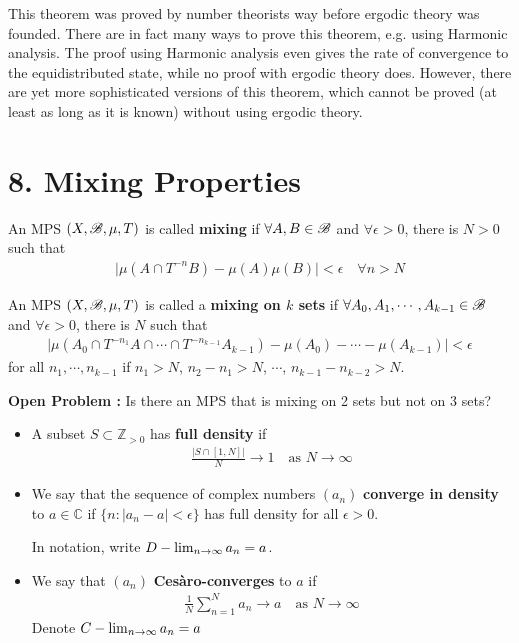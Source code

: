 \documentclass[12pt,a4paper]{report}
\begin{document}
This theorem was proved by number theorists way before ergodic theory was founded. There are in fact many ways to prove this theorem, e.g. using Harmonic analysis. The proof using Harmonic analysis even gives the rate of convergence to the equidistributed state, while no proof with ergodic theory does. However, there are yet more sophisticated versions of this theorem, which cannot be proved (at least as long as it is known) without using ergodic theory.
\s

\section*{8. Mixing Properties}

 An MPS $(X,\mathscr{B}, \mu,T)$ is called \textbf{mixing} if $\forall A,B\in \mathscr{B}$ and $\forall \epsilon>0$, there is $N>0$ such that
\begin{align*}
\Big| \mu(A\cap T^{-n}B) - \mu(A)\mu(B) \Big| < \epsilon \quad \forall n >N
\end{align*}
\s

 An MPS $(X,\mathscr{B}, \mu, T)$ is called a \textbf{mixing on $k$ sets} if $\forall A_0, A_1, \cdots,A_{k-1} \in \mathscr{B}$ and $\forall \epsilon >0$, there is $N$ such that
\begin{align*}
\Big| \mu(A_0 \cap T^{-n_1} A \cap \cdots \cap T^{-n_{k-1}}A_{k-1}) - \mu(A_0) -\cdots -\mu(A_{k-1}) \Big| < \epsilon
\end{align*}
for all $n_1, \cdots, n_{k-1}$ if $n_1>N$, $n_2-n_1>N$, $\cdots$, $n_{k-1} - n_{k-2} >N$.
\s

\textbf{Open Problem :} Is there an MPS that is mixing on 2 sets but not on 3 sets?
\s

\begin{itemize}
\item A subset $S \subset \mathbb{Z}_{>0}$ has \textbf{full density} if
\begin{align*}
\frac{|S\cap [1,N]|}{N} \rightarrow 1 \quad \text{as } N\rightarrow \infty
\end{align*}
\item We say that the sequence of complex numbers $(a_n)$ \textbf{converge in density} to $a\in \mathbb{C}$ if $\{n: |a_n -a| <\epsilon \}$ has full density for all $\epsilon >0$.

In notation, write $D-\lim_{n\rightarrow \infty} a_n = a$.
\item We say that $(a_n)$ \textbf{Ces\`{a}ro-converges} to $a$ if
\begin{align*}
\frac{1}{N} \sum_{n=1}^N a_n \rightarrow a \quad \text{as } N\rightarrow \infty
\end{align*}
Denote $C-\lim_{n\rightarrow \infty} a_n= a$
\end{itemize}
\s
\end{document}
